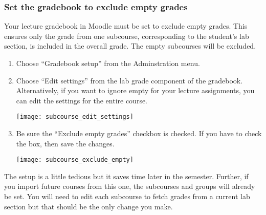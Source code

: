 \documentclass[12pt]{article}
\begin{document}
\subsubsection*{Set the gradebook to exclude empty grades}

Your lecture gradebook in Moodle must be set to exclude empty grades. This ensures only the grade from one subcourse, corresponding to the student's lab section, is included in the overall grade. The empty subcourses will be excluded.

\begin{enumerate}
	\item Choose “Gradebook setup” from the Adminstration menu. 
	
	\item Choose “Edit settings” from the lab grade component of the gradebook. Alternatively, if you want to ignore empty  for your lecture assignments, you can edit the settings for the entire course.
	
	{\centering
		\texttt{[image: subcourse\_edit\_settings]}\par
	}
	
	\item Be sure the “Exclude empty grades” checkbox is checked. If you have to check the box, then save the changes.

	{\centering
	\texttt{[image: subcourse\_exclude\_empty]}\par
}
	
\end{enumerate}

The setup is a little tedious but it saves time later in the semester.  Further, if you import future courses from this one, the subcourses and groups will already be set. You will need to edit each subcourse to fetch grades from a current lab section but that should be the only change you make. 
\end{document}
